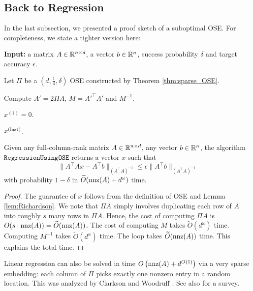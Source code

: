 \subsection{Back to Regression}

In the last subsection, we presented a proof sketch of a suboptimal
OSE. For completeness, we state a tighter version here:

\begin{algorithm2e}[H]

\caption{$\mathtt{RegressionUsingOSE}$}

\SetAlgoLined

\textbf{Input:} a matrix $A\in\mathbb{R}^{n\times d}$, a vector $b\in\mathbb{R}^{n}$,
success probability $\delta$ and target accuracy $\epsilon$.

Let $\Pi$ be a $(d,\frac{1}{4},\delta)$ OSE constructed by Theorem
\ref{thm:sparse_OSE}.

Compute $A'=2\Pi A$, $M=A'^{\top}A'$ and $M^{-1}$.

$x^{(1)}=0$.


\Return $x^{(\mathrm{last})}$.

\end{algorithm2e}
\begin{thm}
Given any full-column-rank matrix $A\in\mathbb{R}^{n\times d}$, any vector
$b\in\mathbb{R}^{n}$, the algorithm $\mathtt{RegressionUsingOSE}$ returns
a vector $x$ such that 
\[
\|A^{\top}Ax-A^{\top}b\|_{(A^{\top}A)^{-1}}\leq\epsilon\|A^{\top}b\|_{(A^{\top}A)^{-1}}
\]
with probability $1-\delta$ in $\widetilde{O}(\mathrm{nnz}(A)+d^{\omega})$
time.
\end{thm}

\begin{proof}
The guarantee of $x$ follows from the definition of OSE and Lemma
\ref{lem:Richardson}. We note that $\Pi A$ simply involves duplicating
each row of $A$ into roughly $s$ many rows in $\Pi A$. Hence, the
cost of computing $\Pi A$ is $O(s\cdot\mathrm{nnz}(A))=\widetilde{O}(\mathrm{nnz}(A))$.
The cost of computing $M$ takes $\widetilde{O}(d^{\omega})$ time.
Computing $M^{-1}$ takes $\widetilde{O}(d^{\omega})$ time. The loop
takes $\widetilde{O}(\mathrm{nnz}(A))$ time. This explains the total time.
\end{proof}
Linear regression can also be solved in time $O\left(\mathrm{nnz}(A)+d^{O(1)}\right)$
via a very sparse embedding: each column of $\Pi$ picks exactly one
nonzero entry in a random location. This was analyzed by Clarkson
and Woodruff \cite{woodruff2014sketching}. See also \cite{kannan_vempala_2017}
for a survey.
